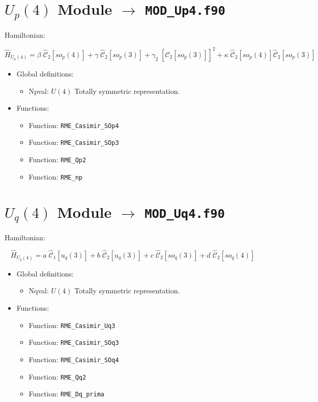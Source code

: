 \documentclass[english,twoside, openright]{report}
\newcommand{\cas}[2]{
  \hat{\mathcal{C}}_{#1}\left[#2\right]
}
\begin{document}
\section{$U_p(4)$ Module $\rightarrow$ \texttt{MOD\_Up4.f90}}
Hamiltonian:

\begin{equation}
  \hat{H}_{U_p(4)} = \beta \; \cas{2}{so_p(4)} + \gamma \; \cas{2}{so_p(3)} + \gamma_2 \; \left[\cas{2}{so_p(3)}\right]^2 + \kappa \; \cas{2}{so_p(4)}\cas{2}{so_p(3)}
\end{equation}

\begin{itemize}
\item Global definitions:
  \begin{itemize}
  \item Npval: $U(4)$ Totally symmetric representation.
  \end{itemize}
\item Functions:
  \begin{itemize}
  \item Function: \texttt{RME\_Casimir\_SOp4}
  \item Function: \texttt{RME\_Casimir\_SOp3}
  \item Function: \texttt{RME\_Qp2}
  \item Function: \texttt{RME\_np}
  \end{itemize}
\end{itemize}

\section{$U_q(4)$ Module $\rightarrow$ \texttt{MOD\_Uq4.f90}}

Hamiltonian:

\begin{equation}
  \hat{H}_{U_q(4)} = a \; \cas{1}{u_q(3)} + b \; \cas{2}{u_q(3)} + c \; \cas{2}{so_q(3)} + d \; \cas{2}{so_q(4)}
\end{equation}

\begin{itemize}
\item Global definitions:
  \begin{itemize}
  \item Nqval: $U(4)$ Totally symmetric representation.
  \end{itemize}
\item Functions:
  \begin{itemize}
  \item Function: \texttt{RME\_Casimir\_Uq3}
  \item Function: \texttt{RME\_Casimir\_SOq3}
  \item Function: \texttt{RME\_Casimir\_SOq4}
  \item Function: \texttt{RME\_Qq2}
  \item Function: \texttt{RME\_Dq\_prima}
  \end{itemize}
\end{itemize}
\end{document}
